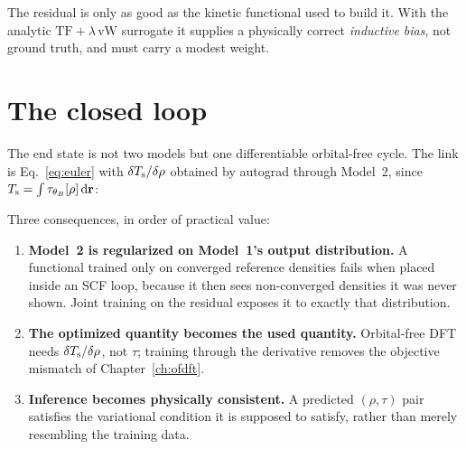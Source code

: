 \begin{pwarn}
The residual is only as good as the kinetic functional used to build it. With
the analytic $\mathrm{TF}+\lambda\,\mathrm{vW}$ surrogate it supplies a
physically correct \emph{inductive bias}, not ground truth, and must carry a
modest weight.
\end{pwarn}

\section{The closed loop}

The end state is not two models but one differentiable orbital-free cycle. The
link is Eq.~\eqref{eq:euler} with $\delta T_{\mathrm{s}}/\delta\rho$ obtained by autograd
through Model~2, since $T_{\mathrm{s}}=\int\tau_{\theta_B}[\rho]\,\mathrm{d}\mathbf{r}$:

\begin{center}
\end{center}

Three consequences, in order of practical value:

\begin{enumerate}
  \item \textbf{Model~2 is regularized on Model~1's output distribution.} A
    functional trained only on converged reference densities fails when placed
    inside an SCF loop, because it then sees non-converged densities it was
    never shown. Joint training on the residual exposes it to exactly that
    distribution.
  \item \textbf{The optimized quantity becomes the used quantity.} Orbital-free
    DFT needs $\delta T_{\mathrm{s}}/\delta\rho$, not $\tau$; training through the
    derivative removes the objective mismatch of Chapter~\ref{ch:ofdft}.
  \item \textbf{Inference becomes physically consistent.} A predicted
    $(\rho,\tau)$ pair satisfies the variational condition it is supposed to
    satisfy, rather than merely resembling the training data.
\end{enumerate}


